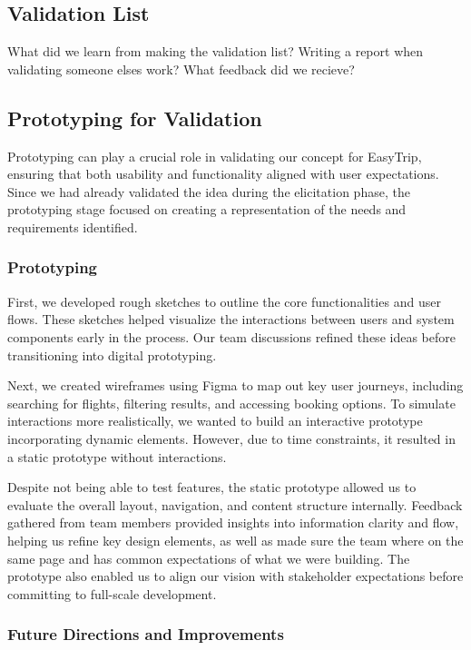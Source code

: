 \subsection{Validation List}
What did we learn from making the validation list?
Writing a report when validating someone elses work?
What feedback did we recieve?


\subsection{Prototyping for Validation}
Prototyping can play a crucial role in validating our concept for EasyTrip, ensuring that both usability and functionality aligned with user expectations. Since we had already validated the idea during the elicitation phase, the prototyping stage focused on creating a representation of the needs and requirements identified.
\subsubsection{Prototyping}
First, we developed rough sketches to outline the core functionalities and user flows. These sketches helped visualize the interactions between users and system components early in the process. Our team discussions refined these ideas before transitioning into digital prototyping.

Next, we created wireframes using Figma to map out key user journeys, including searching for flights, filtering results, and accessing booking options. To simulate interactions more realistically, we wanted to build an interactive prototype incorporating dynamic elements. However, due to time constraints, it resulted in a static prototype without interactions.

Despite not being able to test features, the static prototype allowed us to evaluate the overall layout, navigation, and content structure internally. Feedback gathered from team members provided insights into information clarity and flow, helping us refine key design elements, as well as made sure the team where on the same page and has common expectations of what we were building. The prototype also enabled us to align our vision with stakeholder expectations before committing to full-scale development.

\subsubsection{Future Directions and Improvements}

